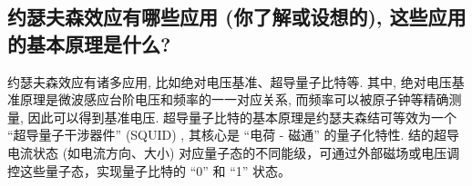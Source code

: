 \documentclass[font=default]{mpltx}
\begin{document}
\subsection{约瑟夫森效应有哪些应用 (你了解或设想的), 这些应用的基本原理是什么? }
约瑟夫森效应有诸多应用, 比如绝对电压基准、超导量子比特等. 其中, 绝对电压基准原理是微波感应台阶电压和频率的一一对应关系, 而频率可以被原子钟等精确测量, 因此可以得到基准电压.
超导量子比特的基本原理是约瑟夫森结可等效为一个 “超导量子干涉器件” (SQUID) , 其核心是 “电荷 - 磁通” 的量子化特性. 结的超导电流状态 (如电流方向、大小) 对应量子态的不同能级，可通过外部磁场或电压调控这些量子态，实现量子比特的 “0” 和 “1” 状态。







\end{document}
